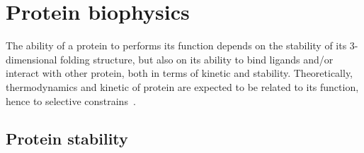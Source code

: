\section{Protein biophysics}
\label{sec:intro-protein-biophysics}

The ability of a protein to performs its function depends on the stability of its 3-dimensional folding structure, but also on its ability to bind ligands and/or interact with other protein, both in terms of kinetic and stability.
Theoretically, thermodynamics and kinetic of protein are expected to be related to its function, hence to selective constrains~\citep{Bastolla2017}.

\subsection{Protein stability}

